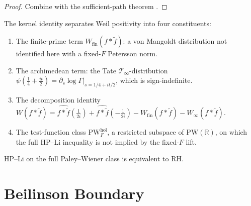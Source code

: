 \begin{proof}
Combine  with the sufficient-path
theorem .
\end{proof}

\begin{remark}
\label{v4-arith:w5-a:rem:domain-summary}
The kernel identity separates Weil positivity into four constituents:
\begin{enumerate}
\item The finite-prime term
\(W_{\mathrm{fin}}(f*\widetilde{f})\): a von Mangoldt distribution not
identified here with a fixed-\(F\) Petersson norm.
\item The archimedean term: the Tate
\(\mathcal{T}_{\infty}\)-distribution
\(\psi(\tfrac{1}{4}+\tfrac{it}{2})=\partial_{s}\log\Gamma|_{s=1/4+it/2}\),
which is sign-indefinite.
\item The decomposition identity
\(W(f*\widetilde{f})=\widehat{f*\widetilde f}(\tfrac{1}{2i})
+\widehat{f*\widetilde f}(-\tfrac{1}{2i})
-W_{\mathrm{fin}}(f*\widetilde f)-W_{\infty}(f*\widetilde f)\).
\item The test-function class \(\mathrm{PW}^{\mathrm{hol}}_{F}\),
a restricted subspace of \(\mathrm{PW}(\mathbb{R})\), on which the
full HP--Li inequality is not implied by the fixed-\(F\) lift.
\end{enumerate}
HP--Li on the full Paley--Wiener class is equivalent to RH.
\end{remark}

\section{Beilinson Boundary}
\label{v4-arith:w5-a:summary}

